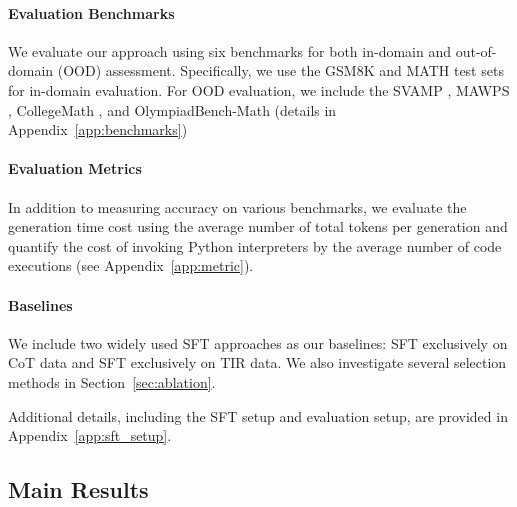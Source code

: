 \paragraph{Evaluation Benchmarks}
We evaluate our approach using six benchmarks for both in-domain and out-of-domain (OOD) assessment. 
Specifically, we use the GSM8K and MATH test sets for in-domain evaluation.
For OOD evaluation, we include the SVAMP \citep{SVAMP2021patel}, MAWPS \citep{mawps2016koncel}, CollegeMath \citep{CollegeMath2024Tang}, and OlympiadBench-Math \citep{OlympiadBench2024He} (details in Appendix~\ref{app:benchmarks})



\paragraph{Evaluation Metrics}
In addition to measuring accuracy on various benchmarks, we evaluate the generation time cost using the average number of total tokens per generation and quantify the cost of invoking Python interpreters by the average number of code executions (see Appendix~\ref{app:metric}). 

\paragraph{Baselines}
We include two widely used SFT approaches as our baselines: SFT exclusively on CoT data and SFT exclusively on TIR data. 
We also investigate several selection methods in Section~\ref{sec:ablation}.

Additional details, including the SFT setup and evaluation setup, are provided in Appendix~\ref{app:sft_setup}.




\subsection{Main Results}\label{sec:results}


